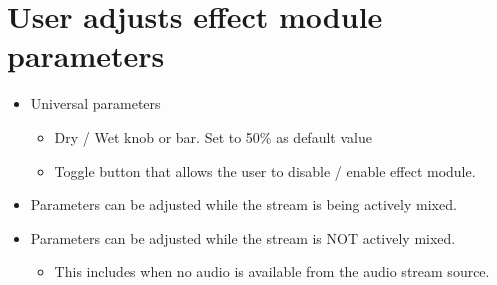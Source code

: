 \section{User adjusts effect module parameters}

\begin{itemize}
	\item Universal parameters
	\begin{itemize}
		\item Dry / Wet knob or bar. Set to 50\% as default value
		\item Toggle button that allows the user to disable / enable effect module.
	\end{itemize}

	\item Parameters can be adjusted while the stream is being actively mixed.
	\item Parameters can be adjusted while the stream is NOT actively mixed.
	\begin{itemize}
		\item This includes when no audio is available from the audio stream source.
	\end{itemize}



\end{itemize}